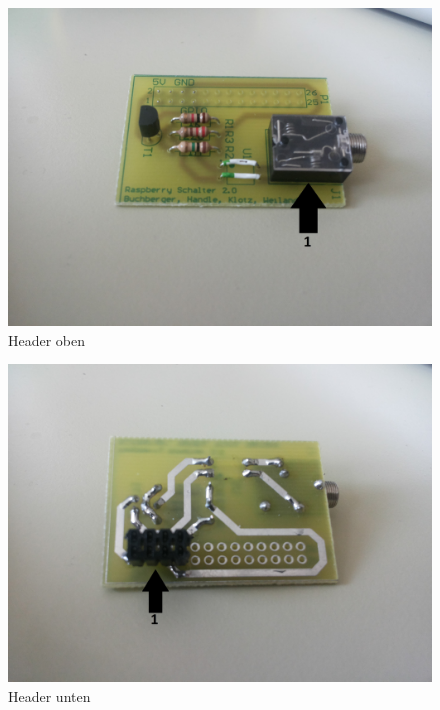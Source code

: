 \begin{figure}[H]
\centering
\includegraphics[keepaspectratio=true, width=13cm]{images/rpi/rpi_header_top.jpg}
\caption{Header oben}
\label{fig:report_hardware_heTo}
\end{figure}
\begin{figure}[H]
\centering
\includegraphics[keepaspectratio=true, width=13cm]{images/rpi/rpi_header_bottom.jpg}
\caption{Header unten}
\label{fig:report_hardware_heBo}
\end{figure}
